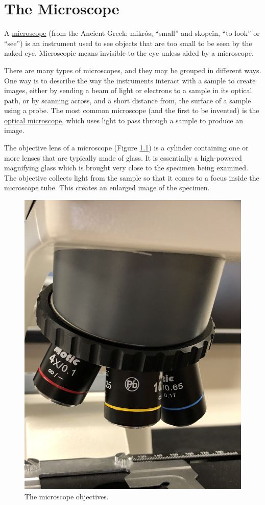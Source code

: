 \chapter{The Microscope}\label{the-microscope}

A \href{https://en.wikipedia.org/wiki/Microscope}{microscope} (from the
Ancient Greek: mikrós, ``small'' and skopeîn, ``to look'' or ``see'') is
an instrument used to see objects that are too small to be seen by the
naked eye. Microscopic means invisible to the eye unless aided by a
microscope.

There are many types of microscopes, and they may be grouped in
different ways. One way is to describe the way the instruments interact
with a sample to create images, either by sending a beam of light or
electrons to a sample in its optical path, or by scanning across, and a
short distance from, the surface of a sample using a probe. The most
common microscope (and the first to be invented) is the
\href{https://en.wikipedia.org/wiki/Optical_microscope}{optical
microscope}, which uses light to pass through a sample to produce an
image.

The objective lens of a microscope (Figure \ref{fig:objectives}) is a
cylinder containing one or more lenses that are typically made of glass.
It is essentially a high-powered magnifying glass which is brought very
close to the specimen being examined. The objective collects light from
the sample so that it comes to a focus inside the microscope tube. This
creates an enlarged image of the specimen.

\begin{figure}

{\centering \includegraphics[width=0.7\linewidth]{./figures/microscope/Microscope_objectives}

}

\caption{The microscope objectives.}\label{fig:objectives}
\end{figure}

